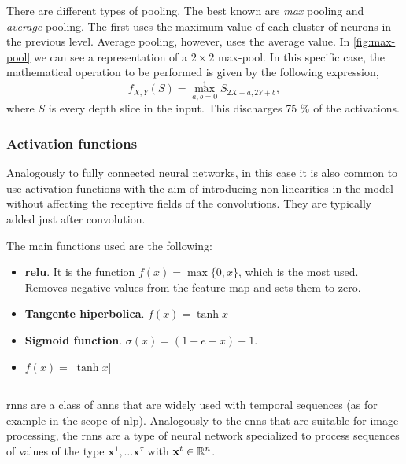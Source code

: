 There are different types of pooling. The best known are \emph{max} pooling and
\emph{average} pooling. The first uses the maximum value of each cluster of
neurons in the previous level. Average pooling, however, uses the average
value. In \vref{fig:max-pool} we can see a representation of a \(2 \times 2\)
max-pool. In this specific case, the mathematical operation to be performed is
given by the following expression,
\begin{equation}
  f_{X,Y}(S) = \max _{a,b=0}^{1}S_{2X+a,2Y+b},
\end{equation}
where \(S\) is every depth slice in the input. This discharges 75 \% of the
activations.

\subsubsection{Activation functions}
Analogously to fully connected neural networks, in this case it is also common
to use activation functions with the aim of introducing non-linearities in the
model without affecting the receptive fields of the convolutions. They are
typically added just after convolution.

The main functions used are the following:
\begin{itemize}
  \item \textbf{\gls*{relu}}. It is the function \(f (x) = \max \{0, x\}\),
  which is the most used. Removes negative values from the feature map and sets
  them to zero.
  \item \textbf{Tangente hiperbolica}. \(f (x) = \tanh x\)
  \item \textbf{Sigmoid function}. \(\sigma (x) ={(1 + e - x)} -1\).
  \item \(f (x) = | \tanh x |\)
\end{itemize}

\subsection{}\label{sec:rnn}

\glspl{rnn} are a class of \glspl{ann} that are widely used with temporal
sequences (as for example in the scope of \gls{nlp}). Analogously to the
\glspl{cnn} that are suitable for image processing, the \glspl{rnn} are a type
of neural network specialized to process sequences of values of the type
\(\mathbf{x}^1, \ldots \mathbf{x}^{\tau}\) with \(\mathbf{x}^t \in \mathbb{R}^n\).

